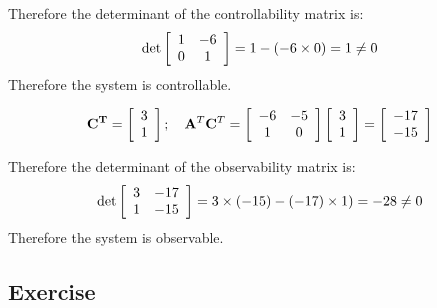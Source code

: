 Therefore the determinant of the controllability matrix is:
\[
\det \left[ {\begin{array}{*{20}c}
   1 & { - 6}  \\
   0 & 1  \\
\end{array}} \right] = 1 - ( - 6 \times 0) = 1 \ne 0
\]
Therefore the system is controllable.
 
\[
{\bf{C}^T} = \left[ {\begin{array}{*{20}c}
   3  \\
   1  \\
\end{array}} \right];\quad {\bf A}^T{\bf C}^T = \left[ {\begin{array}{*{20}c}
   { - 6} & { - 5}  \\
   1 & 0  \\
\end{array}} \right]\left[ {\begin{array}{*{20}c}
   3  \\
   1  \\
\end{array}} \right] = \left[ {\begin{array}{*{20}c}
   { -17 }  \\
   { -15 }  \\
\end{array}} \right]
\]

Therefore the determinant of the observability matrix is:
\[
\det \left[ {\begin{array}{*{20}c}
   3 & { -17 }  \\
   1 & { -15 }  \\
\end{array}} \right] = 3\times(-15) - (-17) \times 1) = -28 \ne 0
\]
Therefore the system is observable.


\subsection{Exercise} %
\label{sub:exercise}


